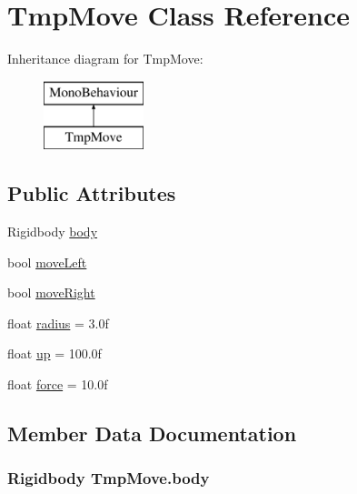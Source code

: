 \hypertarget{class_tmp_move}{}\section{Tmp\+Move Class Reference}
\label{class_tmp_move}
Inheritance diagram for Tmp\+Move\+:\begin{figure}[H]
\begin{center}
\leavevmode
\includegraphics[height=2.000000cm]{class_tmp_move}
\end{center}
\end{figure}
\subsection*{Public Attributes}
\begin{DoxyCompactItemize}
\item 
Rigidbody \hyperlink{class_tmp_move_aa86725b4d9840fc85ccb90522fc72f70}{body}
\item 
bool \hyperlink{class_tmp_move_ace01696c72f650fc1236a8fa61f25bdb}{move\+Left}
\item 
bool \hyperlink{class_tmp_move_a6130ea3b4538fa1761dfc4aeb5cc4ac3}{move\+Right}
\item 
float \hyperlink{class_tmp_move_a2537f998679f53ecc891a26d134e88d2}{radius} = 3.\+0f
\item 
float \hyperlink{class_tmp_move_acd3157eed57aa98545625c0e743d7744}{up} = 100.\+0f
\item 
float \hyperlink{class_tmp_move_a9794fc2a6dbb724a2f2fd136d31b4b56}{force} = 10.\+0f
\end{DoxyCompactItemize}


\subsection{Member Data Documentation}
\hypertarget{class_tmp_move_aa86725b4d9840fc85ccb90522fc72f70}{}
\subsubsection[{body}]{\setlength{\rightskip}{0pt plus 5cm}Rigidbody Tmp\+Move.\+body}\label{class_tmp_move_aa86725b4d9840fc85ccb90522fc72f70}
\hypertarget{class_tmp_move_a9794fc2a6dbb724a2f2fd136d31b4b56}{}
